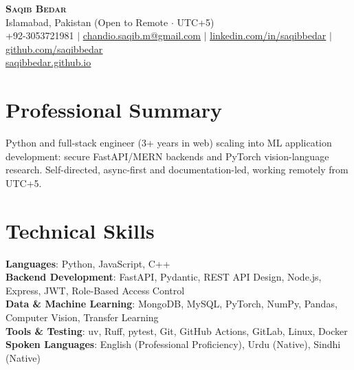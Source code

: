 \documentclass[letterpaper,11pt]{article}
\begin{document}
\begin{center}
    \textbf{\Huge \scshape Saqib Bedar} \\ \vspace{2pt}
    \small Islamabad, Pakistan (Open to Remote $\cdot$ UTC+5) \\ \vspace{2pt}
    \small {+92-3053721981} $|$
    \href{mailto:chandio.saqib.m@gmail.com}{\underline{chandio.saqib.m@gmail.com}} $|$ 
    \href{https://linkedin.com/in/saqibbedar}{\underline{linkedin.com/in/saqibbedar}} $|$
    \href{https://github.com/saqibbedar}{\underline{github.com/saqibbedar}} \\[2pt]
    \href{https://saqibbedar.github.io}{\underline{saqibbedar.github.io}}
\end{center}


\section{Professional Summary}
  \vspace{2pt}
  \small{Python and full-stack engineer (3+ years in web) scaling into ML application development: secure FastAPI/MERN backends and PyTorch vision-language research. Self-directed, async-first and documentation-led, working remotely from UTC+5.}

\section{Technical Skills}
 \begin{itemize}[leftmargin=0.15in, label={}]
    \small{\item{
     \textbf{Languages}{: Python, JavaScript, C++} \\
     \textbf{Backend Development}{: FastAPI, Pydantic, REST API Design, Node.js, Express, JWT, Role-Based Access Control} \\
     \textbf{Data \& Machine Learning}{: MongoDB, MySQL, PyTorch, NumPy, Pandas, Computer Vision, Transfer Learning} \\
     \textbf{Tools \& Testing}{: uv, Ruff, pytest, Git, GitHub Actions, GitLab, Linux, Docker} \\
     \textbf{Spoken Languages}{: English (Professional Proficiency), Urdu (Native), Sindhi (Native)}
    }}
 \end{itemize}

\end{document}

